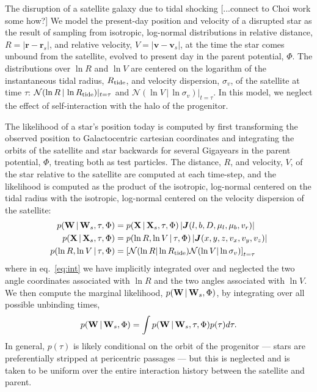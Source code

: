 \documentclass[letterpaper,12pt,preprint]{aastex}
\newcommand{\given}{\,|\,}
\newcommand{\jac}[1]{\left\vert \J{#1} \right\vert}
\newcommand{\D}{{\bf D}}
\newcommand{\W}{{\bf W}}
\newcommand{\X}{{\bf X}}
\newcommand{\J}{{\boldsymbol J}}
\newcommand{\rtide}{R_{\rm tide}}
\newcommand{\bsr}{\boldsymbol r}
\newcommand{\bsv}{\boldsymbol v}
\begin{document}
The disruption of a satellite galaxy due to tidal shocking [...connect to Choi work some how?] We model the present-day position and velocity of a disrupted star as the result of sampling from isotropic, log-normal distributions in relative distance, $R=\left\vert \bsr-\bsr_s \right\vert$, and relative velocity, $V=\left\vert \bsv-\bsv_s \right\vert$, at the time the star comes unbound from the satellite, evolved to present day in the parent potential, $\Phi$. The distributions over $\ln R$ and $\ln V$ are centered on the logarithm of the instantaneous tidal radius, $R_{\rm tide}$, and velocity dispersion, $\sigma_v$, of the satellite at time $\tau$: $\mathcal{N}(\ln R \given \ln\rtide)\vert_{t=\tau}$ and $\mathcal{N}(\ln V \given \ln \sigma_v)\vert_{t=\tau}$. In this model, we neglect the effect of self-interaction with the halo of the progenitor. 

The likelihood of a star's position today is computed by first transforming the observed position to Galactocentric cartesian coordinates and integrating the orbits of the satellite and star backwards for several Gigayears in the parent potential, $\Phi$, treating both as test particles. The distance, $R$, and velocity, $V$, of the star relative to the satellite are computed at each time-step, and the likelihood is computed as the product of the isotropic, log-normal centered on the tidal radius with the isotropic, log-normal centered on the velocity dispersion of the satellite:
\begin{align}
	p(\W \given \W_s, \tau, \Phi) &= p(\X \given \X_s, \tau, \Phi) \jac{(l,b,D,\mu_l,\mu_b,v_r)}\\
	p(\X \given \X_s, \tau, \Phi) &= p(\ln R, \ln V \given \tau, \Phi) \jac{(x,y,z,v_x,v_y,v_z)}\label{eq:int} \\
	p(\ln R, \ln V \given \tau, \Phi) &= \left[\mathcal{N}(\ln R | \ln \rtide)\mathcal{N}(\ln V | \ln \sigma_v)\right]_{t=\tau}
\end{align}
where in eq.~\ref{eq:int} we have implicitly integrated over and neglected the two angle coordinates associated with $\ln R$ and the two angles associated with $\ln V$. We then compute the marginal likelihood, $p(\W \given \W_s, \Phi)$, by integrating over all possible unbinding times,
\begin{align}
	p(\W \given \W_s, \Phi) = \int p(\W \given \W_s, \tau, \Phi)p(\tau) d\tau.
\end{align}
In general, $p(\tau)$ is likely conditional on the orbit of the progenitor --- stars are preferentially stripped at pericentric passages --- but this is neglected and is taken to be uniform over the entire interaction history between the satellite and parent. 
\end{document}
